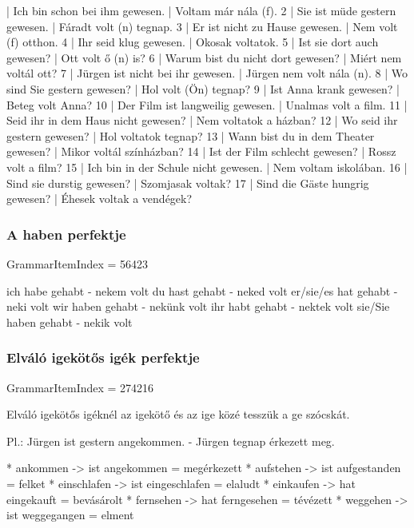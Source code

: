 \documentclass{article}
\newenvironment{desc}{\verbatim}{\endverbatim}
\newenvironment{exmp}{\verbatim}{\endverbatim}
\begin{document}
\begin{exmp}
1 | Ich bin schon bei ihm gewesen. | Voltam már nála (f).
2 | Sie ist müde gestern gewesen. | Fáradt volt (n) tegnap.
3 | Er ist nicht zu Hause gewesen. | Nem volt (f) otthon.
4 | Ihr seid klug gewesen. | Okosak voltatok.
5 | Ist sie dort auch gewesen? | Ott volt ő (n) is?
6 | Warum bist du nicht dort gewesen? | Miért nem voltál ott?
7 | Jürgen ist nicht bei ihr gewesen. | Jürgen nem volt nála (n).
8 | Wo sind Sie gestern gewesen? | Hol volt (Ön) tegnap?
9 | Ist Anna krank gewesen? | Beteg volt Anna?
10 | Der Film ist langweilig gewesen. | Unalmas volt a film.
11 | Seid ihr in dem Haus nicht gewesen? | Nem voltatok a házban?
12 | Wo seid ihr gestern gewesen? | Hol voltatok tegnap?
13 | Wann bist du in dem Theater gewesen? | Mikor voltál színházban?
14 | Ist der Film schlecht gewesen? | Rossz volt a film?
15 | Ich bin in der Schule nicht gewesen. | Nem voltam iskolában.
16 | Sind sie durstig gewesen? | Szomjasak voltak?
17 | Sind die Gäste hungrig gewesen? | Éhesek voltak a vendégek?
\end{exmp}

\subsubsection{A haben perfektje}

GrammarItemIndex = 56423

\begin{desc}

ich habe gehabt - nekem volt
du hast gehabt - neked volt
er/sie/es hat gehabt - neki volt
wir haben gehabt - nekünk volt
ihr habt gehabt - nektek volt
sie/Sie haben gehabt - nekik volt

\end{desc}

\begin{exmp}
\end{exmp}

\subsubsection{Elváló igekötős igék perfektje}

GrammarItemIndex = 274216

\begin{desc}
Elváló igekötős igéknél az igekötő és az ige közé tesszük a ge szócskát.

Pl.: Jürgen ist gestern angekommen. - Jürgen tegnap érkezett meg.

* ankommen -> ist angekommen = megérkezett
* aufstehen -> ist aufgestanden = felket
* einschlafen -> ist eingeschlafen = elaludt
* einkaufen -> hat eingekauft = bevásárolt
* fernsehen -> hat ferngesehen = tévézett
* weggehen -> ist weggegangen = elment
\end{desc}
\end{document}
